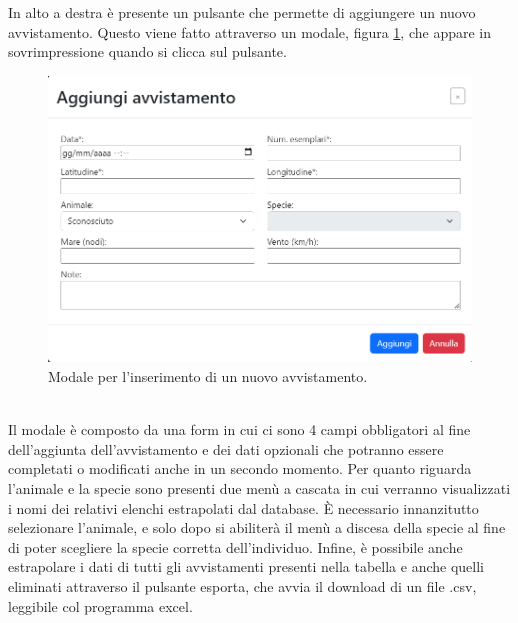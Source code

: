 \documentclass[a4paper,final,12pt]{report}
\begin{document}
In alto a destra è presente un pulsante che permette di aggiungere un nuovo avvistamento. Questo viene fatto attraverso un modale, figura \ref{figura:modaleinseirmentoavvisa}, che appare in sovrimpressione quando si clicca sul pulsante.
\begin{figure}[hbtp]
\centering
\includegraphics[scale=0.50]{img_concettuale/aggiungiAvv.png}
\caption{Modale per l'inserimento di un nuovo avvistamento.}
\label{figura:modaleinseirmentoavvisa}
\end{figure}
\\ Il modale è composto da una form in cui ci sono 4 campi obbligatori al fine dell'aggiunta dell'avvistamento e dei dati opzionali che potranno essere completati o modificati anche in un secondo momento. Per quanto riguarda l'animale e la specie sono presenti due menù a cascata in cui verranno visualizzati i nomi dei relativi elenchi estrapolati dal database. È necessario innanzitutto selezionare l'animale, e solo dopo si abiliterà il menù a discesa della specie al fine di poter scegliere la specie corretta dell'individuo.
Infine, è possibile anche estrapolare i dati di tutti gli avvistamenti presenti nella tabella e anche quelli eliminati attraverso il pulsante esporta, che avvia il download di un file .csv, leggibile col programma excel. 
\end{document}
